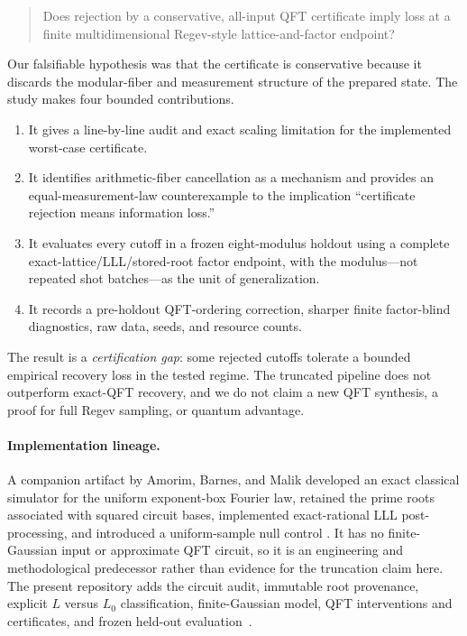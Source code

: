 \documentclass[10pt,twocolumn]{article}
\newcommand{\Lz}{L_0}
\begin{document}
\begin{quote}
Does rejection by a conservative, all-input QFT certificate imply loss at a
finite multidimensional Regev-style lattice-and-factor endpoint?
\end{quote}

Our falsifiable hypothesis was that the certificate is conservative because
it discards the modular-fiber and measurement structure of the prepared
state.  The study makes four bounded contributions.

\begin{enumerate}
\item It gives a line-by-line audit and exact scaling limitation for the
implemented worst-case certificate.
\item It identifies arithmetic-fiber cancellation as a mechanism and provides
an equal-measurement-law counterexample to the implication ``certificate
rejection means information loss.''
\item It evaluates every cutoff in a frozen eight-modulus holdout using a
complete exact-lattice/LLL/stored-root factor endpoint, with the modulus---not
repeated shot batches---as the unit of generalization.
\item It records a pre-holdout QFT-ordering correction, sharper finite
factor-blind diagnostics, raw data, seeds, and resource counts.
\end{enumerate}

The result is a \emph{certification gap}: some rejected cutoffs tolerate a
bounded empirical recovery loss in the tested regime.  The truncated pipeline
does not outperform exact-QFT recovery, and we do not claim a new QFT
synthesis, a proof for full Regev sampling, or quantum advantage.

\paragraph{Implementation lineage.}
A companion artifact by Amorim, Barnes, and Malik developed an exact classical
simulator for the uniform exponent-box Fourier law, retained the prime roots
associated with squared circuit bases, implemented exact-rational LLL
post-processing, and introduced a uniform-sample null control
\cite{AmorimBarnesMalik2026}.  It has no finite-Gaussian input or approximate
QFT circuit, so it is an engineering and methodological predecessor rather
than evidence for the truncation claim here.  The present repository adds the
circuit audit, immutable root provenance, explicit $L$ versus $\Lz$
classification, finite-Gaussian model, QFT interventions and certificates,
and frozen held-out evaluation~\cite{Malik2026Artifact}.
\end{document}
